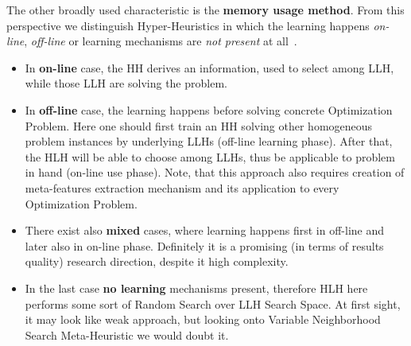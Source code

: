 The other broadly used characteristic is the \textbf{memory usage method}. 
From this perspective we distinguish Hyper-Heuristics in which the learning happens \textit{on-line}, \textit{off-line} or learning mechanisms are \textit{not present} at all~\cite{ryser2014review,burke2019classification}.
\begin{itemize}
	\item In \textbf{on-line} case, the HH derives an information, used to select among LLH, while those LLH are solving the problem.

	\item In \textbf{off-line} case, the learning happens before solving concrete Optimization Problem. Here one should first train an HH solving other homogeneous problem instances by underlying LLHs (off-line learning phase). After that, the HLH will be able to choose among LLHs, thus be applicable to problem in hand (on-line use phase). Note, that this approach also requires creation of meta-features extraction mechanism and its application to every Optimization Problem.

	\item There exist also \textbf{mixed} cases, where learning happens first in off-line and later also in on-line phase. Definitely it is a promising (in terms of results quality) research direction, despite it high complexity.
	
	\item In the last case \textbf{no learning} mechanisms present, therefore HLH here performs some sort of Random Search over LLH Search Space. At first sight, it may look like weak approach, but looking onto Variable Neighborhood Search Meta-Heuristic we would doubt it.
\end{itemize}



